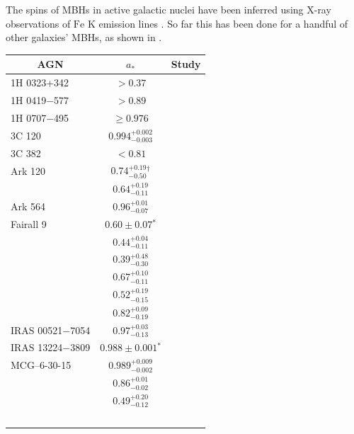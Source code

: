 The spins of MBHs in active galactic nuclei have been inferred using X-ray observations of $\mathrm{Fe}$ $\mathrm{K}$ emission lines \citep{Miller2007, McClintock2011}. So far this has been done for a handful of other galaxies' MBHs, as shown in .
\begin{table}\footnotesize
\centering
\begin{tabular}{l c l }
\toprule
\multicolumn{1}{c}{AGN} & \multicolumn{1}{c}{$a_\ast$} & \multicolumn{1}{c}{Study} \\ \midrule 
1H 0323+342 & $>0.37$ & \citet{Walton2013} \\ %
1H 0419$-$577 & $>0.89$ & \citet{Walton2013} \\ %
1H 0707$-$495 & $\geq 0.976$ & \citet{Zoghbi2010} \\ %
3C 120 & $0.994^{+0.002}_{-0.003}$ & \citet{Lohfink2013} \\
3C 382	& $<0.81$ & \citet{Walton2013} \\ %
Ark 120 & $0.74^{+0.19}_{-0.50}$$^\dagger$ & \citet{Nardini2011} \\ %
 & $0.64^{+0.19}_{-0.11}$ & \citet{Walton2013} \\ %
Ark 564 & $0.96^{+0.01}_{-0.07}$ & \citet{Walton2013} \\ %
Fairall 9 & $0.60 \pm 0.07$$^\ast$ & \citet{Schmoll2009} \\ %
 & $0.44^{+0.04}_{-0.11}$ & \citet{Patrick2011} \\ %
 & $0.39^{+0.48}_{-0.30}$ & \citet{Emmanoulopoulos2011} \\ %
 & $0.67^{+0.10}_{-0.11}$ & \citet{Patrick2011a} \\ %
 & $0.52^{+0.19}_{-0.15}$ & \citet{Lohfink2012} \\ %
 & $0.82^{+0.09}_{-0.19}$ & \citet{Walton2013} \\ %
IRAS 00521$-$7054 & $0.97^{+0.03}_{-0.13}$ & \citet{Tan2012} \\ %
IRAS 13224$-$3809 & $0.988 \pm 0.001$$^\ast$ & \citet{Fabian2013} \\ %
MCG--6-30-15 & $0.989^{+0.009}_{-0.002}$ & \citet{Brenneman2006} \\ %
 & $0.86^{+0.01}_{-0.02}$ & \citet{delaCallePerez2010} \\ %
 & $0.49^{+0.20}_{-0.12}$ & \citet{Patrick2011a} \\ %
$$
\end{tabular}
\end{table}

